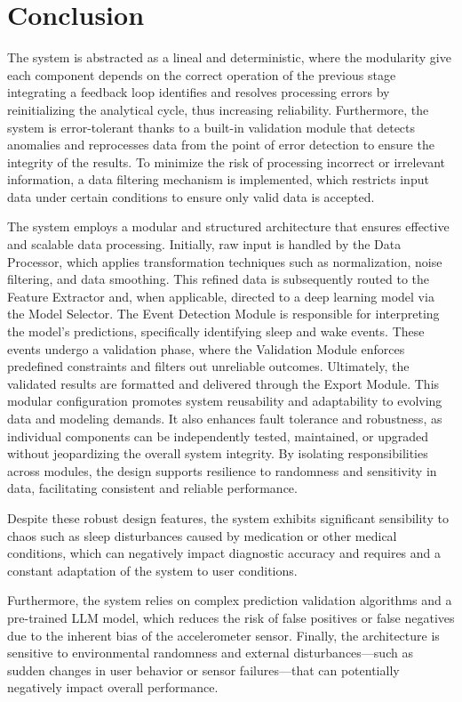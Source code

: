 \documentclass[conference]{IEEEtran}
\begin{document}
\section{Conclusion}
	The system is abstracted as a lineal and deterministic, where the modularity 
	give each component depends on the correct operation of the previous stage integrating a feedback loop identifies
	and resolves processing errors by reinitializing the analytical cycle, thus increasing reliability. Furthermore, 
	the system is error-tolerant thanks to a built-in validation module that detects anomalies and reprocesses data
	from the point of error detection to ensure the integrity of the results. To minimize the risk of processing
	incorrect or irrelevant information, a data filtering mechanism is implemented, which restricts input data under
	certain conditions to ensure only valid data is accepted.

	The system employs a modular and structured architecture that ensures effective and scalable data processing. Initially, 
	raw input is handled by the Data Processor, which applies transformation techniques such as normalization, noise filtering,
	and data smoothing. This refined data is subsequently routed to the Feature Extractor and, when applicable, directed to a deep 
	learning model via the Model Selector. The Event Detection Module is responsible for interpreting the model's predictions, 
	specifically identifying sleep and wake events. These events undergo a validation phase, where the Validation Module enforces 
	predefined constraints and filters out unreliable outcomes. Ultimately, the validated results are formatted and delivered through
	the Export Module.
	This modular configuration promotes system reusability and adaptability to evolving data and modeling demands.
  It also enhances fault tolerance and robustness, as individual components can be independently tested, maintained,
  or upgraded without jeopardizing the overall system integrity. By isolating responsibilities across modules,
  the design supports resilience to randomness and sensitivity in data, facilitating consistent and reliable performance.

	Despite these robust design features, the system exhibits significant sensibility to chaos such as sleep disturbances
	caused by medication or other medical conditions, which can negatively impact diagnostic accuracy and requires and 
	a constant adaptation of the system to user conditions.
	
	Furthermore, the system relies on complex prediction validation algorithms and a pre-trained LLM model, which reduces
	the risk of false positives or false negatives due to the inherent bias of the accelerometer sensor. Finally, the
	architecture is sensitive to environmental randomness and external disturbances—such as sudden changes in user behavior
	or sensor failures—that can potentially negatively impact overall performance.



\end{document}
